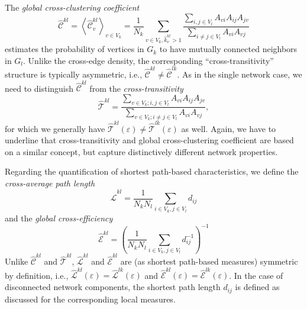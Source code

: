 \documentclass[graybox]{svmult}
\begin{document}
The \textit{global cross-clustering coefficient}
\begin{equation}
\hat{\mathcal{C}}^{kl} = \left<\hat{\mathcal{C}}_v^{kl}\right>_{v \in V_k} = \frac{1}{N_k} \sum_{v \in V_k, \hat{k}_v^{kl}>1} \frac{\sum_{i,j \in V_l} A_{vi} A_{ij} A_{jv}}{\sum_{i \neq j \in V_l} A_{vi} A_{vj}}
\label{eq:globclustering_cross}
\end{equation}
estimates the probability of vertices in $G_k$ to have mutually connected neighbors in $G_l$. Unlike the cross-edge density, the corresponding ``cross-transitivity'' structure is typically asymmetric, i.e., $\hat{\mathcal{C}}^{kl} \neq \hat{\mathcal{C}}^{lk}$. As in the single network case, we need to distinguish $\hat{\mathcal{C}}^{kl}$ from the \textit{cross-transitivity}
\begin{equation}
\hat{\mathcal{T}}^{kl} = \frac{\sum_{v \in V_k; i,j \in V_l} A_{vi} A_{ij} A_{jv}}{\sum_{v \in V_k; i \neq j \in V_l} A_{vi}  A_{vj}},
\label{eq:transitivity_cross}
\end{equation}
for which we generally have $\hat{\mathcal{T}}^{kl}(\varepsilon) \neq \hat{\mathcal{T}}^{lk}(\varepsilon)$ as well. Again, we have to underline that cross-transitivity and global cross-clustering coefficient are based on a similar concept, but capture distinctively different network properties.

Regarding the quantification of shortest path-based characteristics, we define the \textit{cross-average path length}
\begin{equation}
\hat{\mathcal{L}}^{kl} = \frac{1}{N_k N_l} \sum_{i \in V_k, j \in V_l} d_{ij} %
\label{eq:apl_cross}
\end{equation}
and the \textit{global cross-efficiency}
\begin{equation}
\hat{\mathcal{E}}^{kl} = \left( \frac{1}{N_k N_l} \sum_{i \in V_k, j \in V_l} d_{ij}^{-1} \right)^{-1} %
\label{eq:globefficiency_cross}
\end{equation}
\noindent
Unlike $\hat{\mathcal{C}}^{kl}$ and $\hat{\mathcal{T}}^{kl}$, $\hat{\mathcal{L}}^{kl}$ and $\hat{\mathcal{E}}^{kl}$ are (as shortest path-based measures) symmetric by definition, i.e., $\hat{\mathcal{L}}^{kl}(\varepsilon)=\hat{\mathcal{L}}^{lk}(\varepsilon)$ and $\hat{\mathcal{E}}^{kl}(\varepsilon)=\hat{\mathcal{E}}^{lk}(\varepsilon)$. In the case of disconnected network components, the shortest path length $d_{ij}$ is defined as discussed for the corresponding local measures.
\end{document}
